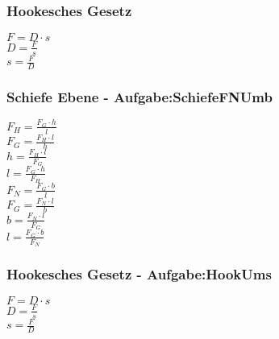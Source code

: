 \subsubsection{Hookesches Gesetz} 
\begin{minipage}{0.45\textwidth} 
$ F = D\cdot s $\\ 
$ D = \frac{F}{s} $\\ 
$ s = \frac{F}{D} $\\ 
\end{minipage} 
\begin{minipage}{0.45\textwidth} 
 
\end{minipage} 
\subsubsection{Schiefe Ebene - Aufgabe:SchiefeFNUmb} 
\begin{minipage}{0.45\textwidth} 
$ F_{H}  = \frac{F_{G} \cdot h}{ l} $\\ 
$ F_{G}  = \frac{F_{H} \cdot l}{ h} $\\ 
$ h = \frac{F_{H} \cdot l}{ F_{G} } $\\ 
$ l = \frac{F_{G} \cdot h}{ F_{H} } $\\ 
$ F_{N}  = \frac{F_{G} \cdot b}{ l} $\\ 
$ F_{G}  = \frac{F_{N} \cdot l}{ b} $\\ 
$ b = \frac{F_{N} \cdot l}{ F_{G} } $\\ 
$ l = \frac{F_{G} \cdot b}{ F_{N} } $\\ 
\end{minipage} 
\begin{minipage}{0.45\textwidth} 
 
\end{minipage} 
\subsubsection{Hookesches Gesetz - Aufgabe:HookUms} 
\begin{minipage}{0.45\textwidth} 
$ F = D\cdot s $\\ 
$ D = \frac{F}{s} $\\ 
$ s = \frac{F}{D} $\\ 
\end{minipage} 
\begin{minipage}{0.45\textwidth} 
 
\end{minipage} 
